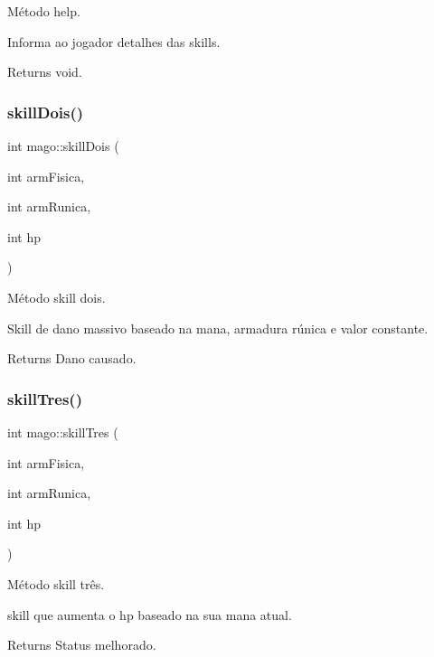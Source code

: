 Método help. 

Informa ao jogador detalhes das skills. \begin{DoxyReturn}{Returns}
void. 
\end{DoxyReturn}
\mbox{\label{classmago_ac0a8309b459ab7f27f356eff72817c2f}} 
\subsubsection{\texorpdfstring{skill\+Dois()}{skillDois()}}
{\footnotesize\ttfamily int mago\+::skill\+Dois (\begin{DoxyParamCaption}\item[{int}]{arm\+Fisica,  }\item[{int}]{arm\+Runica,  }\item[{int}]{hp }\end{DoxyParamCaption})}



Método skill dois. 

Skill de dano massivo baseado na mana, armadura rúnica e valor constante. \begin{DoxyReturn}{Returns}
Dano causado. 
\end{DoxyReturn}
\mbox{\label{classmago_a77280ba40aac7fdf8766950261821a39}} 
\subsubsection{\texorpdfstring{skill\+Tres()}{skillTres()}}
{\footnotesize\ttfamily int mago\+::skill\+Tres (\begin{DoxyParamCaption}\item[{int}]{arm\+Fisica,  }\item[{int}]{arm\+Runica,  }\item[{int}]{hp }\end{DoxyParamCaption})}



Método skill três. 

skill que aumenta o hp baseado na sua mana atual. \begin{DoxyReturn}{Returns}
Status melhorado. 
\end{DoxyReturn}
\mbox{\label{classmago_a039c9975fad5dbc54d5f3ab51bf3df44}} 
